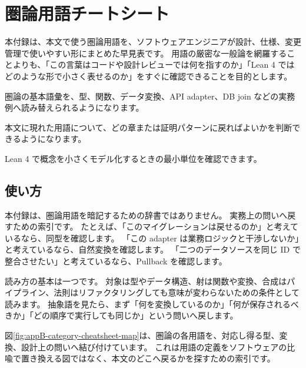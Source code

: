 \chapter{圏論用語チートシート}
\label{app:category-cheatsheet}

\begin{chapterabstract}
本付録は、本文で使う圏論用語を、ソフトウェアエンジニアが設計、仕様、変更管理で使いやすい形にまとめた早見表です。
用語の厳密な一般論を網羅することよりも、「この言葉はコードや設計レビューでは何を指すのか」「Lean 4 ではどのような形で小さく表せるのか」をすぐに確認できることを目的とします。
\end{chapterabstract}

\begin{learninggoals}
\item 圏論の基本語彙を、型、関数、データ変換、API adapter、DB join などの実務例へ読み替えられるようになります。
\item 本文に現れた用語について、どの章または証明パターンに戻ればよいかを判断できるようになります。
\item Lean 4 で概念を小さくモデル化するときの最小単位を確認できます。
\end{learninggoals}

\section{使い方}

本付録は、圏論用語を暗記するための辞書ではありません。
実務上の問いへ戻すための索引です。
たとえば、「このマイグレーションは戻せるのか」と考えているなら、同型を確認します。
「この adapter は業務ロジックと干渉しないか」と考えているなら、自然変換を確認します。
「二つのデータソースを同じ ID で整合させたい」と考えているなら、Pullback を確認します。

読み方の基本は一つです。
対象は型やデータ構造、射は関数や変換、合成はパイプライン、法則はリファクタリングしても意味が変わらないための条件として読みます。
抽象語を見たら、まず「何を変換しているのか」「何が保存されるべきか」「どの順序で実行しても同じか」という問いへ戻します。


図\ref{fig:appB-category-cheatsheet-map}は、圏論の各用語を、対応し得る型、変換、設計上の問いへ結び付けています。
これは用語の定義をソフトウェアの比喩で置き換える図ではなく、本文のどこへ戻るかを探すための索引です。

